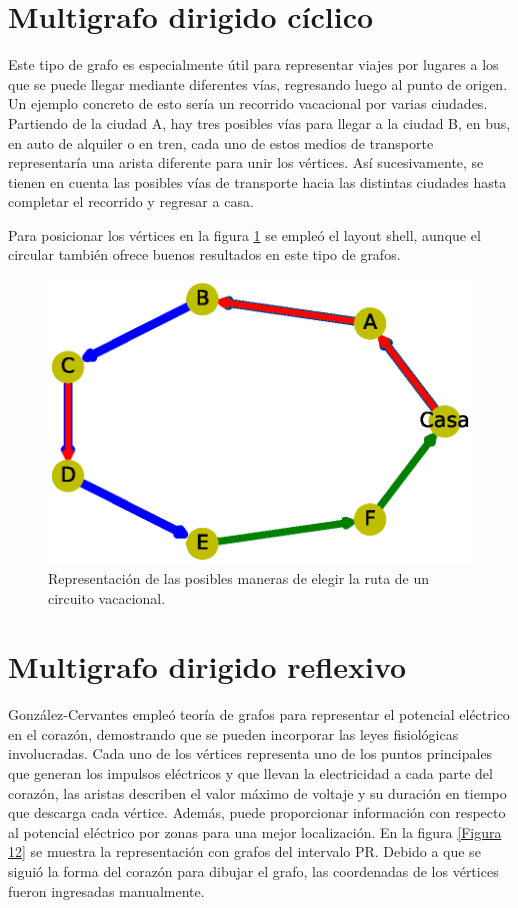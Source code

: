 \documentclass{article}
\begin{document}



\section{Multigrafo dirigido cíclico}

Este tipo de grafo es especialmente útil para representar viajes por lugares a los que se puede llegar mediante diferentes vías, regresando luego al punto de origen. Un ejemplo concreto de esto sería un recorrido vacacional por varias ciudades. Partiendo de la ciudad A, hay tres posibles vías  para llegar a la ciudad B, en bus, en auto de alquiler o en tren, cada uno de estos medios de transporte representaría una arista diferente para unir los vértices. Así sucesivamente, se tienen en cuenta las posibles vías de transporte hacia las distintas ciudades hasta completar el recorrido y regresar a casa. 

Para posicionar los vértices en la figura \ref{Figura 11} se empleó el layout shell, aunque el circular también ofrece buenos resultados en este tipo de grafos.


\begin{figure}
\begin{center}
  \includegraphics[width=.6\columnwidth]{fig11.eps}
  \caption{Representación de las posibles maneras de elegir la ruta de un circuito vacacional.}
  \end{center}
  \label{Figura 11}
\end{figure}




\section{Multigrafo dirigido reflexivo}

González-Cervantes \cite{gonzalez2016potencial} empleó teoría de grafos para representar el potencial eléctrico en el corazón, demostrando que se pueden incorporar las leyes fisiológicas involucradas. Cada uno de los vértices representa uno de los puntos principales que generan los impulsos eléctricos y que llevan la electricidad a cada parte del corazón, las aristas describen el valor máximo de voltaje y su
duración en tiempo que descarga cada vértice. Además, puede proporcionar información con respecto al potencial eléctrico por zonas para una mejor localización.
En la figura \ref{Figura 12} se muestra la representación con grafos del intervalo PR. Debido a que se siguió la forma del corazón para dibujar el grafo, las coordenadas de los vértices fueron ingresadas manualmente.
\end{document}
